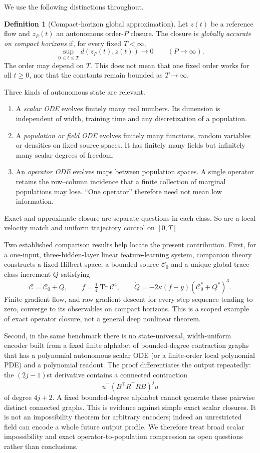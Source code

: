 \documentclass[11pt]{article}
\theoremstyle{definition}
\newtheorem{definition}[theorem]{Definition}
\theoremstyle{remark}
\begin{document}
We use the following distinctions throughout.

\begin{definition}[Compact-horizon global approximation]
Let $z(t)$ be a reference flow and $z_P(t)$ an autonomous order-$P$ closure.
The closure is \emph{globally accurate on compact horizons} if, for every fixed
$T<\infty$,
\[
  \sup_{0\le t\le T} d(z_P(t),z(t))\longrightarrow0
  \qquad(P\to\infty).
\]
The order may depend on $T$.  This does not mean that one fixed order works for
all $t\ge0$, nor that the constants remain bounded as $T\to\infty$.
\end{definition}

Three kinds of autonomous state are relevant.
\begin{enumerate}
\item A \emph{scalar ODE} evolves finitely many real numbers.  Its dimension is
independent of width, training time and any discretization of a population.
\item A \emph{population or field ODE} evolves finitely many functions, random
variables or densities on fixed source spaces.  It has finitely many fields but
infinitely many scalar degrees of freedom.
\item An \emph{operator ODE} evolves maps between population spaces.  A single
operator retains the row--column incidence that a finite collection of marginal
populations may lose.  ``One operator'' therefore need not mean low information.
\end{enumerate}
Exact and approximate closure are separate questions in each class.  So are a
local velocity match and uniform trajectory control on $[0,T]$.

Two established comparison results help locate the present contribution.  First,
for a one-input, three-hidden-layer linear feature-learning system, companion
theory constructs a fixed Hilbert space, a bounded source $\mathcal C_0$ and a
unique global trace-class increment $Q$ satisfying
\[
 \mathcal C=\mathcal C_0+Q,\qquad
 f=\tfrac14\operatorname{Tr}\mathcal C^4,\qquad
 \dot Q=-2\kappa(f-y)(\mathcal C_0^*+Q^*)^3.
\]
Finite gradient flow, and raw gradient descent for every step sequence tending to
zero, converge to its observables on compact horizons.  This is a scoped example
of exact operator closure, not a general deep nonlinear theorem.

Second, in the same benchmark there is no state-universal, width-uniform encoder
built from a fixed finite alphabet of bounded-degree contraction graphs that has
a polynomial autonomous scalar ODE (or a finite-order local polynomial PDE) and
a polynomial readout.  The proof differentiates the output repeatedly: the
$(2j-1)$st derivative contains a connected contraction
\[
 u^\top(B^\top R^\top RB)^j u
\]
of degree $4j+2$.  A fixed bounded-degree alphabet cannot generate these
pairwise distinct connected graphs.  This is evidence against simple exact
scalar closures.  It is not an impossibility theorem for arbitrary encoders;
indeed an unrestricted field can encode a whole future output profile.  We
therefore treat broad scalar impossibility and exact operator-to-population
compression as open questions rather than conclusions.
\end{document}
